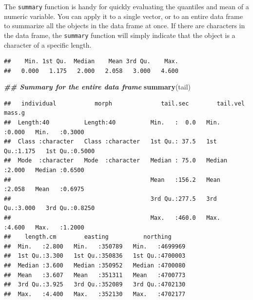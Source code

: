 \documentclass[
]{book}
\newenvironment{Shaded}{\begin{snugshade}}{\end{snugshade}}
\newcommand{\DocumentationTok}[1]{\textcolor[rgb]{0.56,0.35,0.01}{\textbf{\textit{#1}}}}
\newcommand{\FunctionTok}[1]{\textcolor[rgb]{0.13,0.29,0.53}{\textbf{#1}}}
\newcommand{\NormalTok}[1]{#1}
\newcommand{\SpecialCharTok}[1]{\textcolor[rgb]{0.81,0.36,0.00}{\textbf{#1}}}
\begin{document}
The \texttt{summary} function is handy for quickly evaluating the quantiles and mean of a numeric variable. You can apply it to a single vector, or to an entire data frame to summarize all the objects in the data frame at once. If there are characters in the data frame, the \texttt{summary} function will simply indicate that the object is a character of a specific length.

\begin{Shaded}
\end{Shaded}

\begin{verbatim}
##    Min. 1st Qu.  Median    Mean 3rd Qu.    Max. 
##   0.000   1.175   2.000   2.058   3.000   4.600
\end{verbatim}

\begin{Shaded}
\begin{Highlighting}[]
\DocumentationTok{\#\# Summary for the entire data frame}
\FunctionTok{summary}\NormalTok{(tail)}
\end{Highlighting}
\end{Shaded}

\begin{verbatim}
##   individual           morph              tail.sec        tail.vel         mass.g      
##  Length:40          Length:40          Min.   :  0.0   Min.   :0.000   Min.   :0.3000  
##  Class :character   Class :character   1st Qu.: 37.5   1st Qu.:1.175   1st Qu.:0.5000  
##  Mode  :character   Mode  :character   Median : 75.0   Median :2.000   Median :0.6500  
##                                        Mean   :156.2   Mean   :2.058   Mean   :0.6975  
##                                        3rd Qu.:277.5   3rd Qu.:3.000   3rd Qu.:0.8250  
##                                        Max.   :460.0   Max.   :4.600   Max.   :1.2000  
##    length.cm        easting          northing      
##  Min.   :2.800   Min.   :350789   Min.   :4699969  
##  1st Qu.:3.300   1st Qu.:350836   1st Qu.:4700003  
##  Median :3.600   Median :350952   Median :4700080  
##  Mean   :3.607   Mean   :351311   Mean   :4700773  
##  3rd Qu.:3.925   3rd Qu.:352089   3rd Qu.:4702130  
##  Max.   :4.400   Max.   :352130   Max.   :4702177
\end{verbatim}
\end{document}
